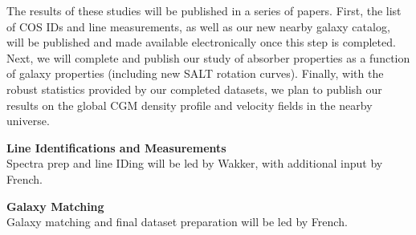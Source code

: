 \documentclass[12pt]{article}
\begin{document}
The results of these studies will be published in a series of papers. First, the list of COS IDs and line measurements, as well as our new nearby galaxy catalog, will be published and made available electronically once this step is completed. Next, we will complete and publish our study of absorber properties as a function of galaxy properties (including new SALT rotation curves). Finally, with the robust statistics provided by our completed datasets, we plan to publish our results on the global CGM density profile and velocity fields in the nearby universe.\\




%
%
\budgetnarrative       %

\textbf{Line Identifications and Measurements}\\
\indent Spectra prep and line IDing will be led by Wakker, with additional input by French.

\noindent \textbf{Galaxy Matching}\\
\indent Galaxy matching and final dataset preparation will be led by French.
\end{document}
